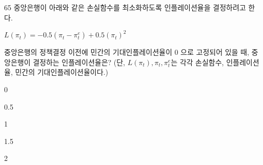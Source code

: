 \begin{question}{65}
중앙은행이 아래와 같은 손실함수를 최소화하도록 인플레이션율을 결정하려고 한다.
\begin{framedtext}
$L(\pi_{t})=-0.5(\pi_{t}-\pi^{e}_{t})+0.5(\pi_{t})^{2}$
\end{framedtext}
중앙은행의 정책결정 이전에 민간의 기대인플레이션율이 0 으로 고정되어 있을 때, 중앙은행이 결정하는 인플레이션율은? (단, $L(\pi_{t}),\pi_{t},\pi^{e}_{t}$는 각각 손실함수, 인플레이션율, 민간의 기대인플레이션율이다.)
\begin{choices}
  \item 0
  \item 0.5
  \item 1
  \item 1.5
  \item 2
\end{choices}
\end{question}
